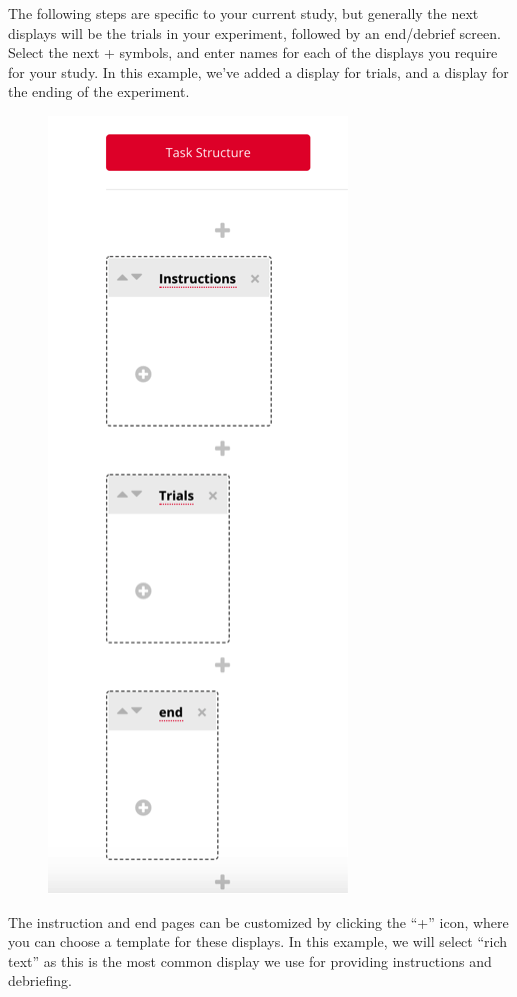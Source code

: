 \documentclass[]{book}
\begin{document}
The following steps are specific to your current study, but generally the next displays will be the trials in your experiment, followed by an end/debrief screen. Select the next + symbols, and enter names for each of the displays you require for your study. In this example, we've added a display for trials, and a display for the ending of the experiment.

\begin{figure}
\centering
\includegraphics{images/research_protocols/gorilla/gorilla15.png}
\caption{}
\end{figure}

The instruction and end pages can be customized by clicking the ``+'' icon, where you can choose a template for these displays. In this example, we will select ``rich text'' as this is the most common display we use for providing instructions and debriefing.
\end{document}
